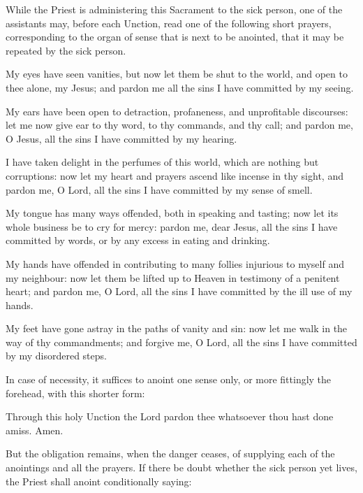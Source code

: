 \begin{rubric}
    While the Priest is administering this Sacrament to the sick person, one of the assistants may, before each Unction, read one of the following short prayers, corresponding to the organ of sense that is next to be anointed, that it may be repeated by the sick person.
\end{rubric}
My eyes have seen vanities, but now let them be shut to the world, and open to thee alone, my Jesus; and pardon me all the sins I have committed by my seeing.\par
My ears have been open to detraction, profaneness, and unprofitable discourses: let me now give ear to thy word, to thy commands, and thy call; and pardon me, O Jesus, all the sins I have committed by my hearing.\par
I have taken delight in the perfumes of this world, which are nothing but corruptions: now let my heart and prayers ascend like incense in thy sight, and pardon me, O Lord, all the sins I have committed by my sense of smell.\par
My tongue has many ways offended, both in speaking and tasting; now let its whole business be to cry for mercy: pardon me, dear Jesus, all the sins I have committed by words, or by any excess in eating and drinking.\par
My hands have offended in contributing to many follies injurious to myself and my neighbour: now let them be lifted up to Heaven in testimony of a penitent heart; and pardon me, O Lord, all the sins I have committed by the ill use of my hands.\par
My feet have gone astray in the paths of vanity and sin: now let me walk in the way of thy commandments; and forgive me, O Lord, all the sins I have committed by my disordered steps.
\begin{rubric}
    In case of necessity, it suffices to anoint one sense only, or more fittingly the forehead, with this shorter form:
\end{rubric}
\noindent
Through this holy {} Unction the Lord pardon thee whatsoever thou hast done amiss. Amen.
\begin{rubric}
    But the obligation remains, when the danger ceases, of supplying each of the anointings and all the prayers. If there be doubt whether the sick person yet lives, the Priest shall anoint conditionally saying:
\end{rubric}\par\noindent
